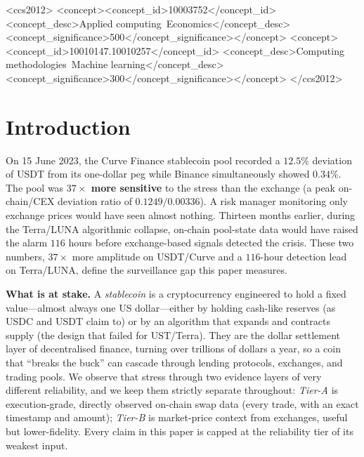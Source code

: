 \documentclass[sigconf,anonymous]{acmart}
\begin{document}

\begin{CCSXML}
<ccs2012>
<concept><concept_id>10003752</concept_id>
<concept_desc>Applied computing~Economics</concept_desc>
<concept_significance>500</concept_significance></concept>
<concept><concept_id>10010147.10010257</concept_id>
<concept_desc>Computing methodologies~Machine learning</concept_desc>
<concept_significance>300</concept_significance></concept>
</ccs2012>
\end{CCSXML}

\maketitle


\section{Introduction}

On 15 June 2023, the Curve Finance stablecoin pool recorded a $12.5\%$ deviation
of USDT from its one-dollar peg while Binance simultaneously showed $0.34\%$.
The pool was \textbf{$37\times$ more sensitive} to the stress than the exchange
(a peak on-chain/CEX deviation ratio of $0.1249/0.00336$).
A risk manager monitoring only exchange prices would have seen almost nothing.
Thirteen months earlier, during the Terra/LUNA algorithmic collapse, on-chain
pool-state data would have raised the alarm $116$ hours before exchange-based
signals detected the crisis.  These two numbers, $37\times$ more amplitude on USDT/Curve and a $116$-hour detection
lead on Terra/LUNA, define the surveillance gap this paper measures.

\textbf{What is at stake.}  A \emph{stablecoin} is a
cryptocurrency engineered to hold a fixed value---almost always one US
dollar---either by holding cash-like reserves (as USDC and USDT claim to) or by
an algorithm that expands and contracts supply (the design that failed for
UST/Terra).  They are the dollar settlement layer of decentralised finance,
turning over trillions of dollars a year, so a coin that ``breaks the buck'' can
cascade through lending protocols, exchanges, and trading pools.  We observe that
stress through two evidence layers of very different reliability, and we keep them
strictly separate throughout: \emph{Tier-A} is execution-grade, directly observed
on-chain swap data (every trade, with an exact timestamp and amount); \emph{Tier-B}
is market-price context from exchanges, useful but lower-fidelity.  Every claim in
this paper is capped at the reliability tier of its weakest input.
\end{document}
